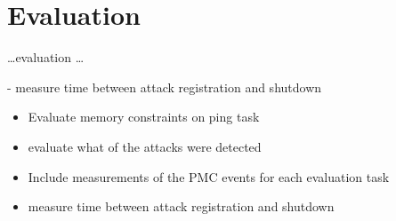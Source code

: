 \chapter{Evaluation}
\label{sec:evaluation}


\ldots evaluation \ldots

- measure time between attack registration and shutdown
\begin{itemize}
    \item Evaluate memory constraints on ping task
    \item evaluate what of the attacks were detected
    \item Include measurements of the PMC events for each evaluation task
    \item measure time between attack registration and shutdown
\end{itemize}

\cleardoublepage

